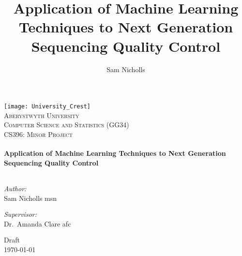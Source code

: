 \documentclass[a4paper,times,numbered,print,index,oneside,PageStyleII,parskip=full]{Classes/PhDThesisPSnPDF}
\title{Application of Machine Learning Techniques to Next Generation Sequencing Quality Control}
\author{Sam Nicholls}
\begin{document}
\frontmatter

\begin{titlepage}
\begin{center}

\texttt{[image: University\_Crest]}~\\[1cm]

\textsc{\huge Aberystwyth University}\\
\textsc{Computer Science and Statistics (GG34)}\\
\textsc{\Large CS396: Minor Project}\\[1.5cm]

\HRule \\[0.4cm]
{ \huge \bfseries Application of Machine Learning Techniques to Next Generation Sequencing Quality Control \\[0.5cm] }
\HRule \\[1.5cm]

\begin{minipage}{0.4\textwidth}
    \begin{flushleft} \large
        \emph{Author:}\\
        Sam Nicholls \small{msn}
    \end{flushleft}
\end{minipage}
\begin{minipage}{0.4\textwidth}
    \begin{flushright} \large
        \emph{Supervisor:} \\
        Dr.~Amanda Clare \small{afc}
    \end{flushright}
\end{minipage}


\vfill
Draft\\
{\large \today}

\end{center}
\end{titlepage}

%

%
%


\tableofcontents
\end{document}
